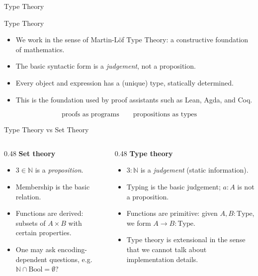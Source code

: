 \documentclass[aspectratio=169,11pt]{beamer}
\newcommand{\partslide}[1]{%
  \begin{frame}[plain]
    \centering
    \vfill
    {\usebeamerfont{section title}\color{accent}#1}
    \vfill
  \end{frame}
}
\begin{document}
\partslide{Type Theory}

\begin{frame}{Type Theory}
  \begin{itemize}
    \item We work in the sense of Martin-L\"of Type Theory: a constructive foundation of mathematics.
    \item The basic syntactic form is a \textit{judgement}, not a proposition.
    \item Every object and expression has a (unique) type, statically determined.
    \item This is the foundation used by proof assistants such as Lean, Agda, and Coq.
  \end{itemize}

  \vspace{0.4em}
  \[
    \text{proofs as programs} \qquad
    \text{propositions as types}
  \]
\end{frame}

\begin{frame}{Type Theory vs Set Theory}
  \begin{columns}[T,totalwidth=\textwidth]
    \begin{column}{0.48\textwidth}
      \textbf{Set theory}
      \begin{itemize}
        \item \(3 \in \mathbb{N}\) is a \textit{proposition}.
        \item Membership is the basic relation.
        \item Functions are derived: subsets of \(A \times B\) with certain properties.
        \item One may ask encoding-dependent questions, e.g.\ \(\mathbb{N} \cap \mathrm{Bool} = \emptyset\)?
      \end{itemize}
    \end{column}

    \begin{column}{0.48\textwidth}
      \textbf{Type theory}
      \begin{itemize}
        \item \(3 : \mathbb{N}\) is a \textit{judgement} (static information).
        \item Typing is the basic judgement; \(a : A\) is not a proposition.
        \item Functions are primitive: given \(A, B : \mathrm{Type}\), we form \(A \to B : \mathrm{Type}\).
        \item Type theory is extensional in the sense that we cannot talk about implementation details.
      \end{itemize}
    \end{column}
  \end{columns}
\end{frame}
\end{document}

